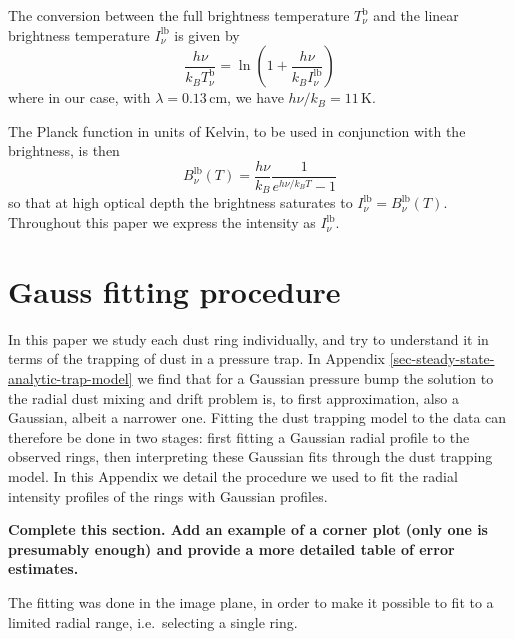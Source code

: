 \documentclass{aa}
\begin{document}
The conversion between the full brightness temperature $T_\nu^{\mathrm{b}}$ and
the linear brightness temperature $I_\nu^{\mathrm{lb}}$ is given by
\begin{equation}\label{eq-convert-lin-to-full-bright}
\frac{h\nu}{k_BT_\nu^{\mathrm{b}}} = \ln\left(1+\frac{h\nu}{k_BI_\nu^{\mathrm{lb}}}\right)
\end{equation}
where in our case, with $\lambda=0.13\,\mathrm{cm}$, we have
$h\nu/k_B=11\,\mathrm{K}$.

The Planck function in units of Kelvin, to be used in conjunction with the
brightness, is then
\begin{equation}\label{eq-app-bnu-bright}
B_\nu^{\mathrm{lb}}(T) = \frac{h\nu}{k_B}\frac{1}{e^{h\nu/k_BT}-1}
\end{equation}
so that at high optical depth the brightness saturates to
$I_\nu^{\mathrm{lb}}=B_\nu^{\mathrm{lb}}(T)$. Throughout this paper we 
express the intensity as $I_\nu^{\mathrm{lb}}$. 



\section{Gauss fitting procedure}
\label{sec-gauss-fitting-procedure}
%
In this paper we study each dust ring individually, and try to understand it in
terms of the trapping of dust in a pressure trap. In Appendix
\ref{sec-steady-state-analytic-trap-model} we find that for a Gaussian pressure
bump the solution to the radial dust mixing and drift problem is, to first
approximation, also a Gaussian, albeit a narrower one. Fitting the dust trapping
model to the data can therefore be done in two stages: first fitting a Gaussian
radial profile to the observed rings, then interpreting these Gaussian fits
through the dust trapping model. In this Appendix we detail the procedure we
used to fit the radial intensity profiles of the rings with Gaussian profiles.

{\bf Complete this section. Add an example of a corner plot (only one is
presumably enough) and provide a more detailed table of error estimates.}


The fitting was done in the
image plane, in order to make it possible to fit to a limited radial range,
i.e.\ selecting a single ring. 
\end{document}
